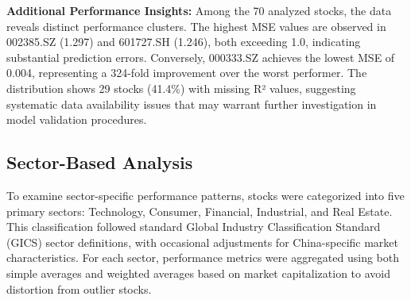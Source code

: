 \documentclass[3p,times,procedia]{elsarticle}
\begin{document}
\textbf{Additional Performance Insights:} Among the 70 analyzed stocks, the data reveals distinct performance clusters. The highest MSE values are observed in 002385.SZ (1.297) and 601727.SH (1.246), both exceeding 1.0, indicating substantial prediction errors. Conversely, 000333.SZ achieves the lowest MSE of 0.004, representing a 324-fold improvement over the worst performer. The distribution shows 29 stocks (41.4\%) with missing R² values, suggesting systematic data availability issues that may warrant further investigation in model validation procedures.





\subsection{Sector-Based Analysis}
To examine sector-specific performance patterns, stocks were categorized into five primary sectors: Technology, Consumer, Financial, Industrial, and Real Estate. This classification followed standard Global Industry Classification Standard (GICS) sector definitions, with occasional adjustments for China-specific market characteristics. For each sector, performance metrics were aggregated using both simple averages and weighted averages based on market capitalization to avoid distortion from outlier stocks.

\begin{table}[!ht]
\centering
\caption{\textbf{Sector-wise Average Performance Metrics}}
\end{table}
\end{document}
